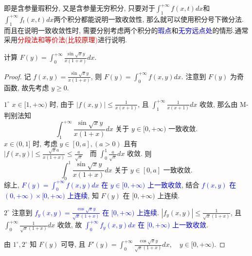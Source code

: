 \documentclass[lang=cn,newtx,10pt,scheme=chinese]{elegantbook}
\begin{document}
\begin{note}
    即是含参量瑕积分, 又是含参量无穷积分, 只要对于$\int_1^{+\infty} f(x,t) dx$和$\int_1^{+\infty} f_t(x,t) dx$两个积分都能说明一致收敛性, 那么就可以使用积分号下微分法.而且在说明一致收敛性时, 需要分别考虑两个积分的\textcolor{blue}{瑕点}和\textcolor{blue}{无穷远点处}的情形.通常采用\textcolor{red}{分段法和等价法(比较原理)}进行说明.
\end{note}

\begin{example}
计算 $F(y) = \int_0^{+\infty} \frac{\sin \sqrt{x}y}{x(1+x)} dx$.
\end{example}
\begin{proof}
记 $f(x,y) = \frac{\sin \sqrt{x}y}{x(1+x)}$, 则 $F(y) = \int_0^{+\infty} f(x,y) dx$. 注意到 $F(y)$ 为奇函数, 故先考虑 $y \ge 0$.

$1^\circ$ $x \in [1, +\infty)$ 时, 由于 $|f(x,y)| \le \frac{1}{x(x+1)}$, 且 $\int_1^{+\infty} \frac{1}{x(x+1)} dx$ 收敛, 那么由 M-判别法知
$$ \int_1^{+\infty} \frac{\sin \sqrt{x}y}{x(1+x)} dx \text{ 关于 } y \in [0, +\infty) \text{ 一致收敛.} $$
$x \in (0, 1]$ 时, 考虑 $y \in [0, a], (a>0)$ 且有
$ |f(x,y)| \le \frac{\sqrt{x}a}{x(1+x)} \le \frac{a}{\sqrt{x}} \quad \text{而 } \int_0^1 \frac{a}{\sqrt{x}} dx \text{ 收敛.} $
则
$$ \int_0^1 \frac{\sin \sqrt{x}y}{x(1+x)} dx \text{ 关于 } y \in [0, a] \text{ 一致收敛.} $$
综上, \textcolor{blue}{$F(y) = \int_0^{+\infty} f(x,y) dx$ 在 $y \in [0, +\infty)$ 上一致收敛}, 结合 \textcolor{blue}{$f(x,y)$ 在 $(0, +\infty) \times [0, +\infty)$ 上连续}, 知 $F(y)$ 在 $[0, +\infty)$ 上连续.

$2^\circ$ 注意到 \textcolor{blue}{$f_y(x,y) = \frac{\cos\sqrt{x}y}{\sqrt{x}(1+x)}$ 在 $[0, +\infty)$ 上连续}.
$|f_y(x,y)| \le \frac{1}{\sqrt{x}(1+x)}$, 且 $\int_0^{+\infty} \frac{1}{\sqrt{x}(1+x)} dx$ 收敛, 故 \textcolor{blue}{$\int_0^{+\infty} f_y(x,y) dx$ 在 $[0, +\infty)$ 上一致收敛}.

由 $1^\circ, 2^\circ$ 知 $F(y)$ 可导, 且 $F'(y) = \int_0^{+\infty} \frac{\cos\sqrt{x}y}{\sqrt{x}(1+x)} dx, \quad y \in [0, +\infty)$.


\end{proof}
\end{document}
